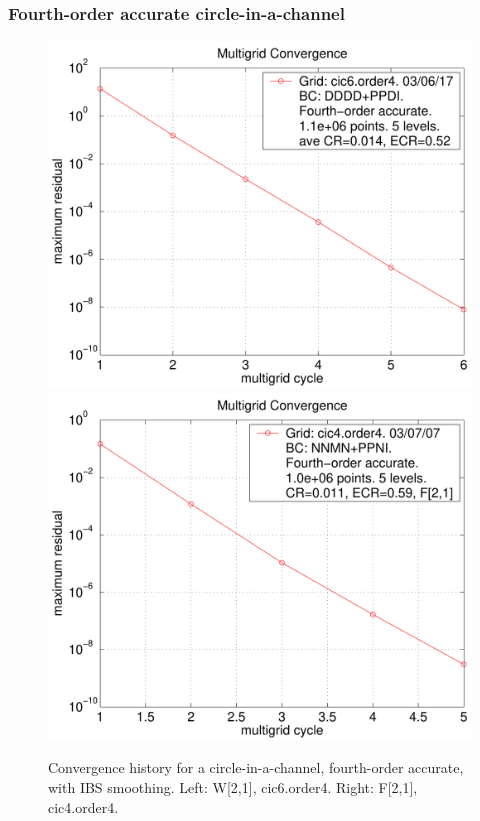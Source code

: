 \documentclass{article}
\begin{document}
\subsubsection{Fourth-order accurate circle-in-a-channel}


\begin{figure}[hbt]
\begin{center}
  \includegraphics[width=.475\linewidth]{fig/residual_cic6_order4}
  \includegraphics[width=.475\linewidth]{fig/residual_cic4_mixed_order4}
  \end{center} 
\caption{Convergence history for a circle-in-a-channel, fourth-order accurate, with IBS smoothing. Left: W[2,1], cic6.order4.
    Right: F[2,1], cic4.order4. }
\label{fig:square1024}
\end{figure}



% 
\end{document}
